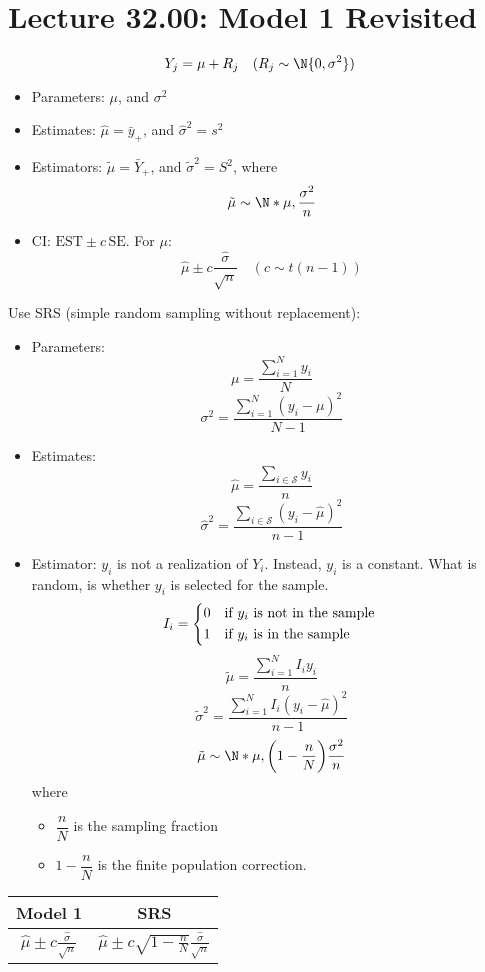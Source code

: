 \section{Lecture 32.00: Model 1 Revisited}
\[ Y_{j}=\mu+R_j\quad(R_j \sim \N{0,\sigma^2}) \]
\begin{itemize}
    \item Parameters: $ \mu $, and $ \sigma^2 $
    \item Estimates: $ \hat{\mu}=\bar{y}_+ $, and $ \hat{\sigma}^2=s^2 $
    \item Estimators: $ \tilde{\mu}=\bar{Y}_+ $, and $ \tilde{\sigma}^2=S^2 $, where
          \[ \tilde{\mu} \sim \N*{\mu,\frac{\sigma^2}{n}} \]
    \item CI\@: $ \text{EST} \pm c\, \text{SE} $. For $ \mu $:
          \[ \hat{\mu}\pm c \frac{\hat{\sigma}}{\sqrt{n}} \quad(c \sim t(n-1)) \]
\end{itemize}
Use SRS (simple random sampling without replacement):
\begin{itemize}
    \item Parameters:
          \[ \mu=\frac{\sum_{i=1}^{N}y_i}{N} \]
          \[ \sigma^2=\frac{\sum_{i=1}^{N} (y_i-\mu)^2}{N-1}  \]
    \item Estimates:
          \[ \hat{\mu}=\frac{\sum_{i\in\mathcal{S}}y_i}{n}   \]
          \[ \hat{\sigma}^2=\frac{\sum_{i\in\mathcal{S}} (y_i-\hat{\mu})^2}{n-1}  \]
    \item Estimator: $ y_i $ is not a realization of $ Y_i $. Instead, $ y_i $ is a
          constant. What is random, is whether $ y_i $ is selected for the sample.
          \[ I_i=\begin{cases*}
                  0 & if $ y_i $ is not in the sample \\
                  1 & if $ y_i $ is in the sample
              \end{cases*} \]
          \[ \tilde{\mu}=\frac{\sum_{i=1}^{N} I_i y_i}{n} \]
          \[ \tilde{\sigma}^2=\frac{\sum_{i=1}^{N} I_i(y_i-\hat{\mu})^2}{n-1}  \]
          \[ \tilde{\mu}
              \sim \N*{\mu,\biggl(1-\frac{n}{N} \biggr)\frac{\sigma^2}{n}} \]
          where
          \begin{itemize}
              \item $ \dfrac{n}{N} $ is the sampling fraction
              \item $ 1-\dfrac{n}{N} $ is the finite population correction.
          \end{itemize}
\end{itemize}
\begin{table}[!htbp]
    \centering
    \begin{NiceTabular}{c|c}
        Model 1                                                        & SRS                                                                                  \\
        \midrule
        $ \displaystyle \hat{\mu}\pm c \frac{\hat{\sigma}}{\sqrt{n}} $ & $ \displaystyle \hat{\mu}\pm c \sqrt{1-\frac{n}{N} }\frac{\hat{\sigma}}{\sqrt{n}}  $
    \end{NiceTabular}
\end{table}
